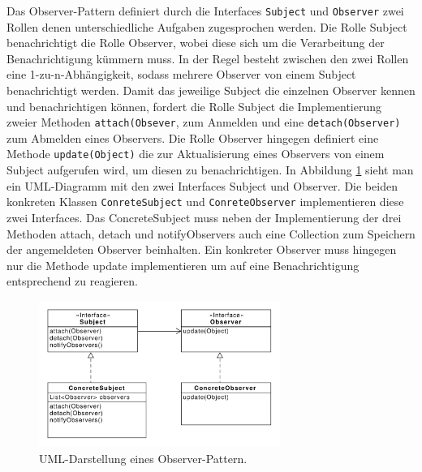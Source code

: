Das Observer-Pattern definiert durch die Interfaces \texttt{Subject} und \texttt{Observer} zwei Rollen denen unterschiedliche Aufgaben zugesprochen werden. Die Rolle Subject benachrichtigt die Rolle Observer, wobei diese sich um die Verarbeitung der Benachrichtigung kümmern muss. In der Regel besteht zwischen den zwei Rollen eine 1-zu-n-Abhängigkeit, sodass mehrere Observer von einem Subject benachrichtigt werden.
Damit das jeweilige Subject die einzelnen Observer kennen und benachrichtigen können, fordert die Rolle Subject die Implementierung zweier Methoden \texttt{attach(Obsever}, zum Anmelden  und eine \texttt{detach(Observer)} zum Abmelden eines Observers.
Die Rolle Observer hingegen definiert eine Methode \texttt{update(Object)} die zur Aktualisierung eines Observers von einem Subject aufgerufen wird, um diesen zu benachrichtigen.
In Abbildung \ref{observerdiagramm} sieht man ein UML-Diagramm mit den zwei Interfaces Subject und Observer. Die beiden konkreten Klassen \texttt{ConreteSubject} und \texttt{ConreteObserver} implementieren diese zwei Interfaces. Das ConcreteSubject muss neben der Implementierung der drei Methoden attach, detach und notifyObservers auch eine Collection zum Speichern der angemeldeten Observer beinhalten. Ein konkreter Observer muss hingegen nur die Methode update implementieren um auf eine Benachrichtigung entsprechend zu reagieren.

\begin{figure}[h!]
\centering
\includegraphics[width=0.7\textwidth]{./paper/observer/observer}
\caption{UML-Darstellung eines Observer-Pattern.}
\label{observerdiagramm}
\end{figure} 
